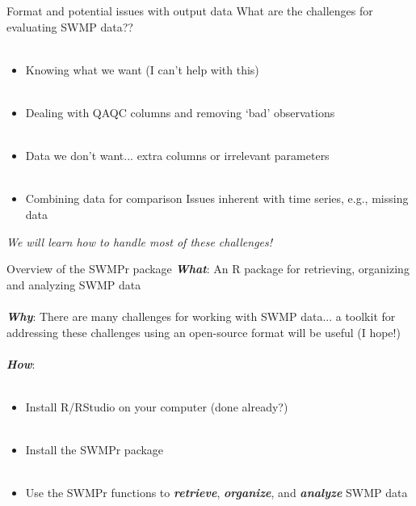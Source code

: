 \documentclass[xcolor=svgnames]{beamer}\usepackage[]{graphicx}\usepackage[]{color}
\newcommand{\Bigtxt}[1]{\textbf{\textit{#1}}}
\begin{document}
\begin{frame}{Format and potential issues with output data}
\onslide<+->
What are the challenges for evaluating SWMP data?? \\~\\
\onslide<+->
\begin{itemize}
\item Knowing what we want (I can't help with this) \\~\\
\onslide<+->
\item Dealing with QAQC columns and removing `bad' observations \\~\\
\onslide<+->
\item Data we don't want... extra columns or irrelevant parameters \\~\\
\onslide<+->
\item Combining data for comparison
\onslide<+-> Issues inherent with time series, e.g., missing data
\end{itemize}
\onslide<+->
\centerline{\emph{We will learn how to handle most of these challenges!}}
\end{frame}

\begin{frame}{Overview of the SWMPr package}
\onslide<+->
\textbf{\emph{What}}: An R package for retrieving, organizing and analyzing SWMP data \\~\\
\onslide<+->
\Bigtxt{Why}: There are many challenges for working with SWMP data... a toolkit for addressing these challenges using an open-source format will be useful (I hope!) \\~\\
\onslide<+->
\Bigtxt{How}: \\~\\
\begin{itemize}
\item Install R/RStudio on your computer (done already?) \\~\\
\item Install the SWMPr package \\~\\
\item Use the SWMPr functions to \Bigtxt{retrieve}, \Bigtxt{organize}, and \Bigtxt{analyze} SWMP data 
\end{itemize}
\end{frame}
\end{document}

